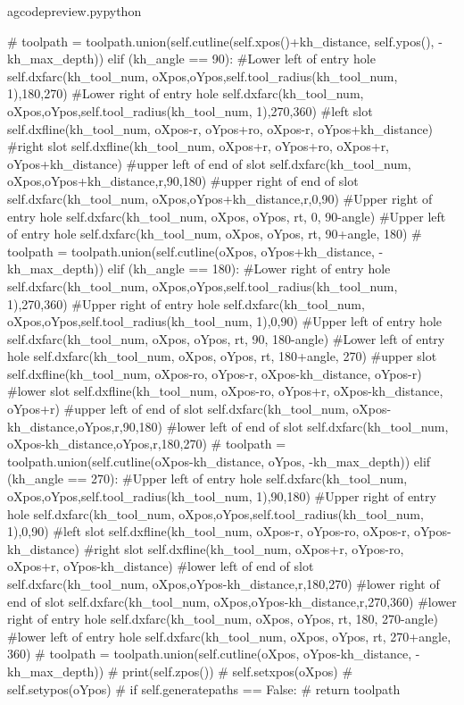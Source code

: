 \documentclass{ltxdoc}
\begin{document}
\begin{writecode}{a}{gcodepreview.py}{python}
{#            toolpath = toolpath.union(self.cutline(self.xpos()+kh_distance, self.ypos(), -kh_max_depth))
        elif (kh_angle == 90):
#Lower left of entry hole
            self.dxfarc(kh_tool_num, oXpos,oYpos,self.tool_radius(kh_tool_num, 1),180,270)
#Lower right of entry hole
            self.dxfarc(kh_tool_num, oXpos,oYpos,self.tool_radius(kh_tool_num, 1),270,360)
#left slot
            self.dxfline(kh_tool_num, oXpos-r, oYpos+ro, oXpos-r, oYpos+kh_distance)
#right slot
            self.dxfline(kh_tool_num, oXpos+r, oYpos+ro, oXpos+r, oYpos+kh_distance)
#upper left of end of slot
            self.dxfarc(kh_tool_num, oXpos,oYpos+kh_distance,r,90,180)
#upper right of end of slot
            self.dxfarc(kh_tool_num, oXpos,oYpos+kh_distance,r,0,90)
#Upper right of entry hole
            self.dxfarc(kh_tool_num, oXpos, oYpos, rt, 0, 90-angle)
#Upper left of entry hole
            self.dxfarc(kh_tool_num, oXpos, oYpos, rt, 90+angle, 180)
#            toolpath = toolpath.union(self.cutline(oXpos, oYpos+kh_distance, -kh_max_depth))
        elif (kh_angle == 180):
#Lower right of entry hole
            self.dxfarc(kh_tool_num, oXpos,oYpos,self.tool_radius(kh_tool_num, 1),270,360)
#Upper right of entry hole
            self.dxfarc(kh_tool_num, oXpos,oYpos,self.tool_radius(kh_tool_num, 1),0,90)
#Upper left of entry hole
            self.dxfarc(kh_tool_num, oXpos, oYpos, rt, 90, 180-angle)
#Lower left of entry hole
            self.dxfarc(kh_tool_num, oXpos, oYpos, rt, 180+angle, 270)
#upper slot
            self.dxfline(kh_tool_num, oXpos-ro, oYpos-r, oXpos-kh_distance, oYpos-r)
#lower slot
            self.dxfline(kh_tool_num, oXpos-ro, oYpos+r, oXpos-kh_distance, oYpos+r)
#upper left of end of slot
            self.dxfarc(kh_tool_num, oXpos-kh_distance,oYpos,r,90,180)
#lower left of end of slot
            self.dxfarc(kh_tool_num, oXpos-kh_distance,oYpos,r,180,270)
#            toolpath = toolpath.union(self.cutline(oXpos-kh_distance, oYpos, -kh_max_depth))
        elif (kh_angle == 270):
#Upper left of entry hole
            self.dxfarc(kh_tool_num, oXpos,oYpos,self.tool_radius(kh_tool_num, 1),90,180)
#Upper right of entry hole
            self.dxfarc(kh_tool_num, oXpos,oYpos,self.tool_radius(kh_tool_num, 1),0,90)
#left slot
            self.dxfline(kh_tool_num, oXpos-r, oYpos-ro, oXpos-r, oYpos-kh_distance)
#right slot
            self.dxfline(kh_tool_num, oXpos+r, oYpos-ro, oXpos+r, oYpos-kh_distance)
#lower left of end of slot
            self.dxfarc(kh_tool_num, oXpos,oYpos-kh_distance,r,180,270)
#lower right of end of slot
            self.dxfarc(kh_tool_num, oXpos,oYpos-kh_distance,r,270,360)
#lower right of entry hole
            self.dxfarc(kh_tool_num, oXpos, oYpos, rt, 180, 270-angle)
#lower left of entry hole
            self.dxfarc(kh_tool_num, oXpos, oYpos, rt, 270+angle, 360)
#            toolpath = toolpath.union(self.cutline(oXpos, oYpos-kh_distance, -kh_max_depth))
#        print(self.zpos())
#        self.setxpos(oXpos)
#        self.setypos(oYpos)
#        if self.generatepaths == False:
#            return toolpath
            
}
\end{writecode}
\end{document}
